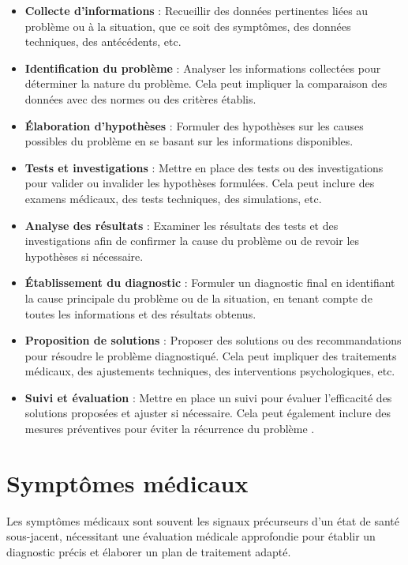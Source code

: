 \begin{itemize}
\item \textbf{Collecte d'informations} :
Recueillir des données pertinentes liées au problème ou à la situation, que ce soit des symptômes, des données techniques, des antécédents, etc.

\item \textbf{Identification du problème} :
Analyser les informations collectées pour déterminer la nature du problème. Cela peut impliquer la comparaison des données avec des normes ou des critères établis.

\item \textbf{Élaboration d'hypothèses} :
Formuler des hypothèses sur les causes possibles du problème en se basant sur les informations disponibles.

\item \textbf{Tests et investigations} :
Mettre en place des tests ou des investigations pour valider ou invalider les hypothèses formulées. Cela peut inclure des examens médicaux, des tests techniques, des simulations, etc.

\item \textbf{Analyse des résultats} :
Examiner les résultats des tests et des investigations afin de confirmer la cause du problème ou de revoir les hypothèses si nécessaire.

\item \textbf{Établissement du diagnostic} :
Formuler un diagnostic final en identifiant la cause principale du problème ou de la situation, en tenant compte de toutes les informations et des résultats obtenus.

\item \textbf{Proposition de solutions} :
Proposer des solutions ou des recommandations pour résoudre le problème diagnostiqué. Cela peut impliquer des traitements médicaux, des ajustements techniques, des interventions psychologiques, etc.

\item \textbf{Suivi et évaluation} :
Mettre en place un suivi pour évaluer l'efficacité des solutions proposées et ajuster si nécessaire. Cela peut également inclure des mesures préventives pour éviter la récurrence du problème .

\end{itemize}

\section{Symptômes médicaux  }
Les symptômes médicaux sont souvent les signaux précurseurs d'un état de santé sous-jacent, nécessitant une évaluation médicale approfondie pour établir un diagnostic précis et élaborer un plan de traitement adapté.
